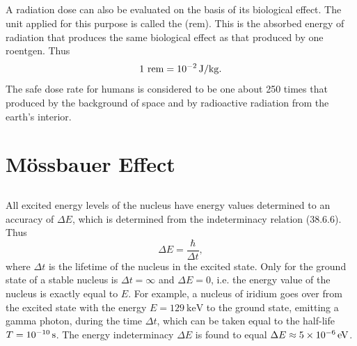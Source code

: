\subsection{}\label{42.7.7} A radiation dose can also be evaluated on the basis of its biological effect. The unit applied for this purpose is called the  (rem). This is the absorbed energy of radiation that produces the same biological effect as that produced by one roentgen. Thus 
\begin{equation*}%
1~\text{rem} = \SI{d-2}{\joule\per\kilo\gram}.
\end{equation*}
The safe dose rate for humans is considered to be one about
250 times that produced by the background of space and by radioactive radiation from the earth's interior.

\section{M\"ossbauer Effect}
\label{sec-42.8} 


\subsection{}\label{42.8.1} All excited energy levels of the nucleus have energy values determined to an accuracy of $\Delta E$, which is determined from the indeterminacy relation (38.6.6). Thus
\begin{equation*}%
\Delta E = \frac{\hbar}{\Delta t},
\end{equation*}
where $\Delta t$ is the lifetime of the nucleus in the excited state. Only for the ground state of a stable nucleus is $\Delta t = \infty$ and $\Delta E = 0$, i.e. the energy value of the nucleus is exactly equal to $E$. For example, a nucleus of iridium  goes over from the excited state with the energy $E = \SI{129}{\keV}$ to the ground state, emitting a gamma photon, during the time $\Delta t$, which can be taken equal to the half-life  $T  = \SI{d-10}{\second}$. The
energy indeterminacy $\Delta E$ is found to equal $\Delta E \approx  \SI{5d-6}{\eV}$.

